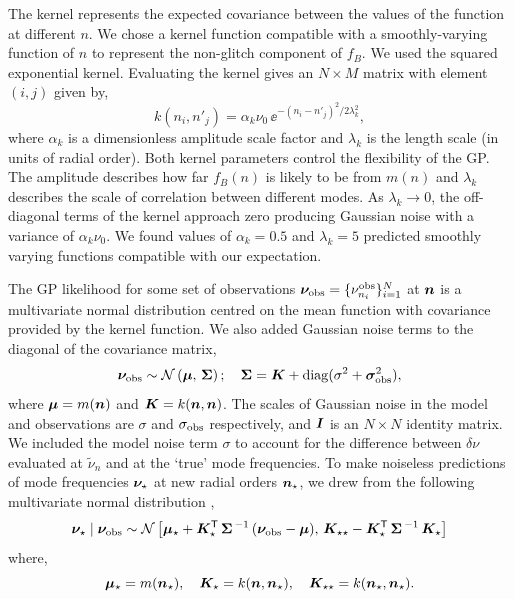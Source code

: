 The kernel represents the expected covariance between the values of the function at different \(n\). We chose a kernel function compatible with a smoothly-varying function of \(n\) to represent the non-glitch component of \(f_B\). We used the squared exponential kernel. Evaluating the kernel gives an \(N \times M\) matrix with element \((i,j)\) given by,
%
\begin{equation}
    k(n_i, n'_j) = \alpha_k \nu_0 \, \ee^{- (n_i - n'_j)^2 / 2\lambda_k^2},
\end{equation}
%
where \(\alpha_k\) is a dimensionless amplitude scale factor and \(\lambda_k\) is the length scale (in units of radial order). Both kernel parameters control the flexibility of the GP. The amplitude describes how far \(f_B(n)\) is likely to be from \(m(n)\) and \(\lambda_k\) describes the scale of correlation between different modes. As \(\lambda_k \rightarrow 0\), the off-diagonal terms of the kernel approach zero producing Gaussian noise with a variance of \(\alpha_k\nu_0\). We found values of \(\alpha_k = 0.5\) and \(\lambda_k = 5\) predicted smoothly varying functions compatible with our expectation. 

The GP likelihood for some set of observations \(\bm{\nu}_{{\mathrm{obs}}} = \{\nu_{n_i}^{{\mathrm{obs}}}\}_{i=1}^N\) at \(\bm{n}\) is a multivariate normal distribution centred on the mean function with covariance provided by the kernel function. We also added Gaussian noise terms to the diagonal of the covariance matrix,
%
\begin{equation}
    \bm{\nu}_{{\mathrm{obs}}} \sim \mathcal{N}\left( \bm{\mu}, \,  \bm{\Sigma} \right); \quad \bm{\Sigma} = \bm{K} + \mathrm{diag}(\sigma^2 + \bm{\sigma}_{{\mathrm{obs}}}^2), \label{eq:gp-like}
\end{equation}
%
where \(\bm{\mu} = m(\bm{n})\) and \(\bm{K} = k(\bm{n}, \bm{n})\). The scales of Gaussian noise in the model and observations are \(\sigma\) and \(\sigma_{{\mathrm{obs}}}\) respectively, and \(\bm{I}\) is an \(N \times N\) identity matrix. We included the model noise term \(\sigma\) to account for the difference between \(\delta\nu\) evaluated at \(\tilde{\nu}_n\) and at the `true' mode frequencies. To make noiseless predictions of mode frequencies \(\bm{\nu}_\star\) at new radial orders \(\bm{n}_\star\), we drew from the following multivariate normal distribution \citep{Rasmussen.Williams2006},
%
\begin{equation}
    \bm{\nu}_\star \mid \bm{\nu}_{{\mathrm{obs}}} \sim \mathcal{N} \left[ \bm{\mu}_\star + \bm{K}_\star^\mathsf{T} \, \bm{\Sigma}^{\,-1} \, (\bm{\nu}_{{\mathrm{obs}}} - \bm{\mu}), \, \bm{K}_{\star\star} - \bm{K}_\star^\mathsf{T} \, \bm{\Sigma}^{\,-1} \, \bm{K}_\star \right]
\end{equation}
%
where,
%
\begin{equation*}
    \bm{\mu}_\star = m(\bm{n}_\star), \quad \bm{K}_\star = k(\bm{n}, \bm{n}_\star), \quad \bm{K}_{\star\star} = k(\bm{n}_\star, \bm{n}_\star).
\end{equation*}
%

